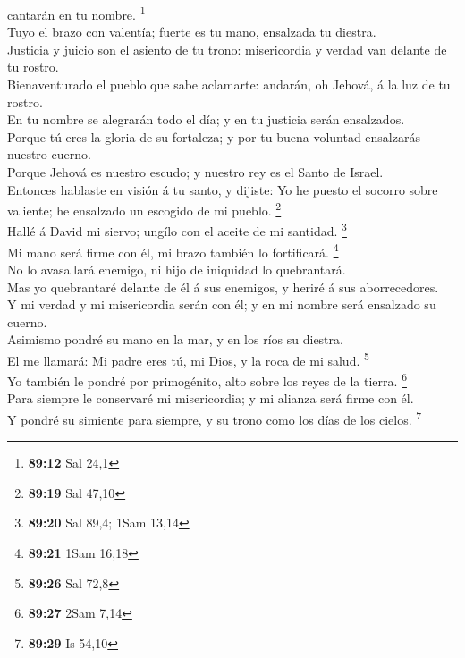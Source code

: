 cantarán en tu nombre. \footnote{\textbf{89:12} Sal 24,1}\\
 Tuyo el brazo con valentía; fuerte es tu mano, ensalzada
tu diestra.\\
 Justicia y juicio son el asiento de tu trono:
misericordia y verdad van delante de tu rostro.\\
 Bienaventurado el pueblo que sabe aclamarte: andarán, oh
Jehová, á la luz de tu rostro.\\
 En tu nombre se alegrarán todo el día; y en tu justicia
serán ensalzados.\\
 Porque tú eres la gloria de su fortaleza; y por tu buena
voluntad ensalzarás nuestro cuerno.\\
 Porque Jehová es nuestro escudo; y nuestro rey es el
Santo de Israel.\\
 Entonces hablaste en visión á tu santo, y dijiste: Yo he
puesto el socorro sobre valiente; he ensalzado un escogido de mi pueblo.
\footnote{\textbf{89:19} Sal 47,10}\\
 Hallé á David mi siervo; ungílo con el aceite de mi
santidad. \footnote{\textbf{89:20} Sal 89,4; 1Sam 13,14}\\
 Mi mano será firme con él, mi brazo también lo
fortificará. \footnote{\textbf{89:21} 1Sam 16,18}\\
 No lo avasallará enemigo, ni hijo de iniquidad lo
quebrantará.\\
 Mas yo quebrantaré delante de él á sus enemigos, y
heriré á sus aborrecedores.\\
 Y mi verdad y mi misericordia serán con él; y en mi
nombre será ensalzado su cuerno.\\
 Asimismo pondré su mano en la mar, y en los ríos su
diestra.\\
 El me llamará: Mi padre eres tú, mi Dios, y la roca de
mi salud. \footnote{\textbf{89:26} Sal 72,8}\\
 Yo también le pondré por primogénito, alto sobre los
reyes de la tierra. \footnote{\textbf{89:27} 2Sam 7,14}\\
 Para siempre le conservaré mi misericordia; y mi alianza
será firme con él.\\
 Y pondré su simiente para siempre, y su trono como los
días de los cielos. \footnote{\textbf{89:29} Is 54,10}\\
